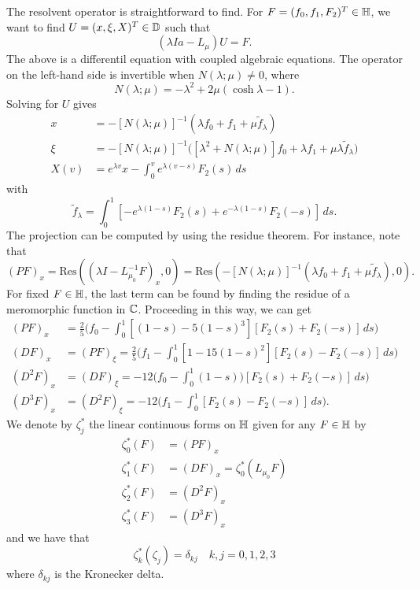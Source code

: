 The resolvent operator is straightforward to find. For \(F=(f_0,f_1,F_2)^T\in\mathbb{H}\), we want to find \(U = (x,\xi, X)^T\in \mathbb{D}\) such that
\begin{equation}
	(\lambda I a- L_\mu) U = F.
\end{equation}
The above is a differentil equation with coupled algebraic equations. The operator on the left-hand side is invertible when \(N(\lambda ;\mu) \neq 0\), where 
\begin{equation}
	N(\lambda;\mu) = - \lambda^2 + 2\mu(\cosh \lambda - 1).
\end{equation}
Solving for \(U\) gives
\begin{align}
	x &= -[N(\lambda;\mu)]^{-1}(\lambda f_0 + f_1 + \mu\tilde f_\lambda) \\
	\xi &= -[N(\lambda;\mu)]^{-1} \Big( [\lambda^2 + N(\lambda;\mu)]f_0 + \lambda f_1 + \mu\lambda \tilde f_\lambda \Big) \\
	X(v) &= e^{\lambda v}x - \int_0^v e^{\lambda(v-s)} F_2(s)\, ds
\end{align}
with 
\begin{equation}
	\tilde f_\lambda = \int_0^1 [-e^{\lambda(1-s)} F_2(s) + e^{-\lambda (1-s)} F_2(-s)]\, ds.
\end{equation}
The projection can be computed by using the residue theorem. For instance, note that 
\begin{equation}
	(PF)_x = \mathrm{Res}((\lambda  I - L_{\mu_0} ^{-1} F)_x, 0) = \mathrm{Res}(-[N(\lambda;\mu)]^{-1}(\lambda f_0 + f_1 + \mu\tilde f_\lambda), 0).
\end{equation}
For fixed \(F\in\mathbb{H}\), the last term can be found by finding the residue of a meromorphic function in \(\mathbb{C}\). Proceeding in this way, we can get 
\begin{align}
	(PF)_x &= \frac 2 5 \Bigg(  f_0 - \int_0^1[(1-s) - 5(1-s)^3][F_2(s) + F_2(-s)]\, ds \Bigg) \\
	(DF)_x &= (PF)_\xi = \frac 2 5 \Bigg(  f_1 - \int_0^1[1 - 15(1-s)^2][F_2(s) - F_2(-s)]\, ds \Bigg) \\
	(D^2F)_x &= (DF)_\xi = -12 \Bigg( f_0 - \int_0^1(1-s)) [F_2(s) + F_2(-s)]\, ds \Bigg) \\
	(D^3F)_x &= (D^2 F)_\xi = -12 \Bigg(f_1 - \int_0^1 [F_2(s) - F_2(-s)]\, ds \Bigg).
\end{align}
We denote by \(\zeta_j^*\) the linear continuous forms on \(\mathbb{H}\) given for any \(F\in\mathbb{H}\) by
\begin{equation}
	\begin{aligned}
		\zeta_0^*(F)&= (PF)_x \\
		\zeta_1^*(F) &= (DF)_x  = \zeta_0^*(L_{\mu_0} F) \\
		\zeta_2^*(F) &= (D^2F)_x  \\
		\zeta_3^*(F) &= (D^3F)_x 
	\end{aligned}
\end{equation}
and we have that
\begin{equation}
	\zeta_k^*(\zeta_j) = \delta_{kj} \quad k,j = 0, 1, 2, 3
\end{equation}
where \(\delta_{kj}\) is the Kronecker delta.

